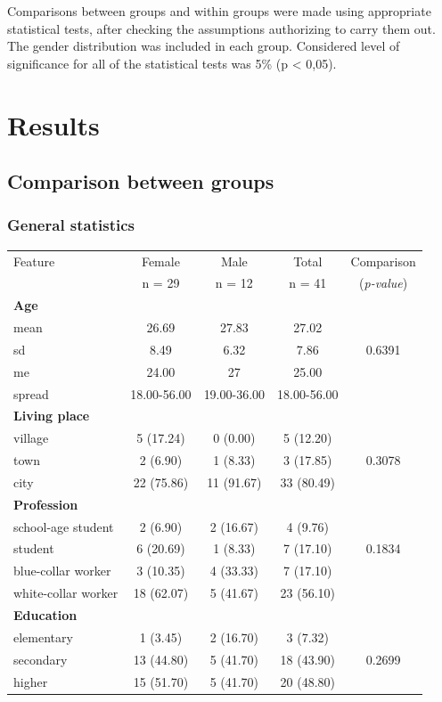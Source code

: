 \documentclass[12pt,a4paper,notitlepage]{report}
\begin{document}
Comparisons between groups and within groups were made using appropriate statistical tests, after checking the assumptions authorizing to carry them out.
The gender distribution was included in each group. Considered level of significance for all of the statistical tests was 5\% (p < 0,05).



\chapter{Results}
\section{Comparison between groups}

\subsection{General statistics} 
\noindent
\begin{tabular}{lcccc}
\hline Feature 				& Female 	& Male 		& Total 		&  Comparison \\
 		 					& n = 29 	& n = 12	& n = 41	&  (\textit{p-value}) \\
\hline
\bf{Age}						&			&			&			&		\\
\indent mean					& 26.69		& 27.83		& 27.02		& 		\\
\indent sd					& 8.49		& 6.32		& 7.86		& 0.6391 \\
\indent me					& 24.00		& 27		& 25.00		& 		\\
\indent spread				& 18.00-56.00 & 19.00-36.00	& 18.00-56.00	 & \\
\hline

\bf{Living place} 				&			&			&			&		\\
\indent village				& 5 (17.24)	& 0 (0.00)	& 5	(12.20)	& 		\\
\indent town					& 2 (6.90)	& 1	(8.33) 	& 3	(17.85) 	&  0.3078 \\
\indent city					& 22 (75.86)	& 11 (91.67) & 33 (80.49) & 		\\
\hline

\bf{Profession} 				&			&			&			&		\\
\indent school-age student		& 2 (6.90)	& 2 (16.67)	& 4	(9.76) 	& 		\\
\indent student				& 6 (20.69)	& 1	(8.33) 	& 7	(17.10) 	& 0.1834 \\
\indent blue-collar worker		& 3 (10.35)	& 4 (33.33) 	& 7 (17.10) 	& 		\\
\indent white-collar worker	& 18 (62.07)	& 5 (41.67) 	& 23 (56.10) & 		\\
\hline

\bf{Education} 				&			&			&			&		\\
\indent elementary			& 1 (3.45)	& 2 (16.70)	& 3	(7.32) 	& 		\\
\indent secondary			& 13 (44.80)	& 5	(41.70) 	& 18 (43.90) & 0.2699 \\
\indent higher				& 15 (51.70)	& 5 (41.70) 	& 20 (48.80) & 		\\
\hline

\end{tabular} \\ \\
\end{document}
